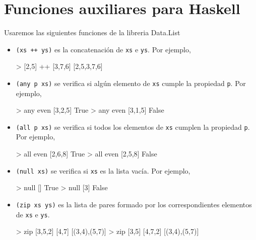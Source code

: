 \chapter{Funciones auxiliares para Haskell}

Usaremos las siguientes funciones de la libreria Data.List

\begin{itemize}
\item \texttt{(xs ++ ys)} es la concatenación de \texttt{xs} e \texttt{ys}. Por ejemplo,
        
\begin{sesion}
> [2,5] ++ [3,7,6]
[2,5,3,7,6]
\end{sesion}
        
\item \texttt{(any p xs)} se verifica si algún elemento de \texttt{xs} cumple
  la propiedad \texttt{p}. Por ejemplo,

\begin{sesion}
> any even [3,2,5]
True
> any even [3,1,5]
False
\end{sesion}      

\item \texttt{(all p xs)} se verifica si todos los elementos de \texttt{xs}
  cumplen la propiedad \texttt{p}. Por ejemplo,

\begin{sesion}
> all even [2,6,8]
True
> all even [2,5,8]
False
\end{sesion}      

\item \texttt{(null xs)} se verifica si \texttt{xs} es la lista vacía. Por
  ejemplo, 

\begin{sesion}    
> null []
True
> null [3]
False
\end{sesion}      

\item \texttt{(zip xs ys)} es la lista de pares formado por los
  correspondientes elementos de \texttt{xs} e \texttt{ys}.

\begin{sesion}    
> zip [3,5,2] [4,7]
[(3,4),(5,7)]
> zip [3,5] [4,7,2]
[(3,4),(5,7)]
\end{sesion}              
\end{itemize}

